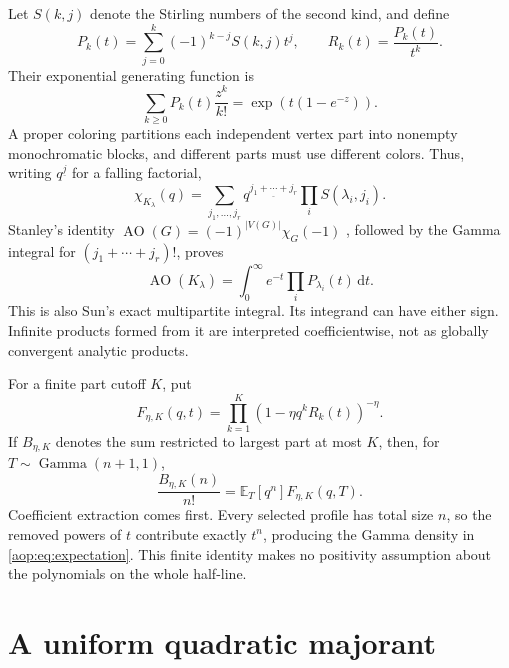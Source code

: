 \documentclass[11pt]{article}
\theoremstyle{remark}\newtheorem{remark}[theorem]{Remark}
\newcommand{\AO}{\operatorname{AO}}
\newcommand{\E}{\mathbb E}
\newcommand{\dd}{\,\mathrm d}
\newcommand{\coeff}[2]{[#1^{#2}]}
\begin{document}
Let $S(k,j)$ denote the Stirling numbers of the second kind, and define
\[
 P_k(t)=\sum_{j=0}^k(-1)^{k-j}S(k,j)t^j,\qquad R_k(t)=\frac{P_k(t)}{t^k}.
\]
Their exponential generating function is
\begin{equation}\label{aop:eq:Pegf}
 \sum_{k\ge0}P_k(t)\frac{z^k}{k!}=\exp(t(1-e^{-z})).
\end{equation}
A proper coloring partitions each independent vertex part into nonempty
monochromatic blocks, and different parts must use different colors.
Thus, writing $q^{\underline j}$ for a falling factorial,
\[
 \chi_{K_\lambda}(q)=\sum_{j_1,\ldots,j_r}
 q^{\underline{j_1+\cdots+j_r}}\prod_iS(\lambda_i,j_i).
\]
Stanley's identity $\AO(G)=(-1)^{|V(G)|}\chi_G(-1)$ \cite{stanley},
followed by the Gamma integral for $(j_1+\cdots+j_r)!$, proves
\begin{equation}\label{aop:eq:exact}
 \AO(K_\lambda)=\int_0^\infty e^{-t}\prod_iP_{\lambda_i}(t)\dd t.
\end{equation}
This is also Sun's exact multipartite integral. Its integrand can have
either sign. Infinite products formed from it are interpreted
coefficientwise, not as globally convergent analytic products.

For a finite part cutoff $K$, put
\[
 F_{\eta,K}(q,t)=\prod_{k=1}^K(1-\eta q^kR_k(t))^{-\eta}.
\]
If $B_{\eta,K}$ denotes the sum restricted to largest part at most $K$,
then, for $T\sim\operatorname{Gamma}(n+1,1)$,
\begin{equation}\label{aop:eq:expectation}
 \frac{B_{\eta,K}(n)}{n!}=\E_T\coeff qn F_{\eta,K}(q,T).
\end{equation}
Coefficient extraction comes first. Every selected profile has total size
$n$, so the removed powers of $t$ contribute exactly $t^n$, producing
the Gamma density in \eqref{aop:eq:expectation}. This finite identity makes
no positivity assumption about the polynomials on the whole half-line.

\section{A uniform quadratic majorant}\label{aop:sec:majorant}
\end{document}
